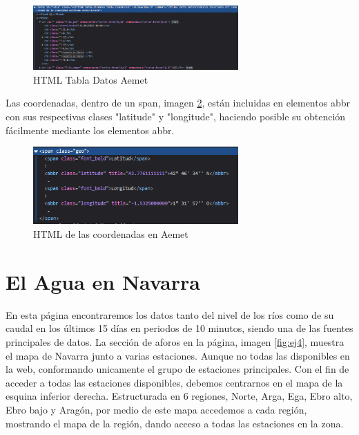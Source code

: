 \begin{figure} [H]
	\centering
	\includegraphics[width=0.7\textwidth]{fig/AemetDataHTML.png}
	\caption[HTML de la tabla de datos de Aemet de la estación en Aranguren (Navarra)]{HTML Tabla Datos Aemet}
	\label{fig:ej20}
\end{figure}

Las coordenadas, dentro de un span, imagen \ref{fig:ej21}, están incluidas en elementos abbr con sus respectivas clases "latitude" y "longitude", haciendo posible su obtención fácilmente mediante los elementos abbr.

\begin{figure} [H]
	\centering
	\includegraphics[width=0.7\textwidth]{fig/AemetCoordHTML.png}
	\caption[HTML de las coordenadas de Aemet de la estación en Aranguren (Navarra)]{HTML de las coordenadas en Aemet}
	\label{fig:ej21}
\end{figure}

\section{El Agua en Navarra}
En esta página encontraremos los datos tanto del nivel de los ríos como de su caudal en los últimos 15 días en periodos de 10 minutos, siendo una de las fuentes principales de datos.
\newline
\newline
La sección de aforos en la página, imagen \ref{fig:ej4}, muestra el mapa de Navarra junto a varias estaciones. Aunque no todas las disponibles en la web, conformando unicamente el grupo de estaciones principales.\newline
\newline
Con el fin de acceder a todas las estaciones disponibles, debemos centrarnos en el mapa de la esquina inferior derecha. Estructurada en 6 regiones, Norte, Arga, Ega, Ebro alto, Ebro bajo y Aragón, por medio de este mapa accedemos a cada región, mostrando el mapa de la región, dando acceso a todas las estaciones en la zona.


